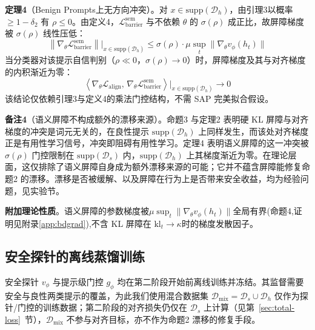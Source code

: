 \documentclass[lettersize,journal]{IEEEtran}
\begin{document}
\textbf{定理4}（Benign Prompts上无方向冲突）。对 $x \in \mathrm{supp}(\mathcal{D}_h)$，由引理3以概率 $\geq 1-\delta_2$ 有 $\rho \leq 0$。由定义4，$\mathcal{L}^{\text{sem}}_{\text{barrier}}$ 与不依赖 $\theta$ 的 $\sigma(\rho)$ 成正比，故屏障梯度被 $\sigma(\rho)$ 线性压低：
\begin{equation}
\left\|\nabla_\theta \mathcal{L}^{\text{sem}}_{\text{barrier}}\right\|\bigg|_{x \in \mathrm{supp}(\mathcal{D}_h)} \leq \sigma(\rho)\cdot \mu\sup_t\|\nabla_\theta v_\phi(h_t)\|
\end{equation}
当分类器对该提示自信判别（$\rho \ll 0$，$\sigma(\rho) \to 0$）时，屏障梯度及其与对齐梯度的内积渐近为零：
\begin{equation}\label{eq:no-conflict-benign}
\left\langle \nabla_\theta \mathcal{L}_{\text{align}},\, \nabla_\theta \mathcal{L}^{\text{sem}}_{\text{barrier}} \right\rangle\bigg|_{x \in \mathrm{supp}(\mathcal{D}_h)} \to 0
\end{equation}
该结论仅依赖引理3与定义4的乘法门控结构，不需 SAP 完美拟合假设。

\textbf{备注4}（语义屏障不构成额外的漂移来源）。命题3 与定理2 表明硬 KL 屏障与对齐梯度的冲突是词元无关的，在良性提示 $\mathrm{supp}(\mathcal{D}_h)$ 上同样发生，而该处对齐梯度正是有用性学习信号，冲突即阻碍有用性学习。定理4 表明语义屏障的这一冲突被 $\sigma(\rho)$ 门控限制在 $\mathrm{supp}(\mathcal{D}_s)$ 内，$\mathrm{supp}(\mathcal{D}_h)$ 上其梯度渐近为零。在理论层面，这仅排除了语义屏障自身成为额外漂移来源的可能；它并不蕴含屏障能修复命题2 的漂移。漂移是否被缓解、以及屏障在行为上是否带来安全收益，均为经验问题，见实验节。

\textbf{附加理论性质}。语义屏障的参数梯度被$\mu\sup_t\|\nabla_\theta v_\phi(h_t)\|$全局有界(命题4,证明见附录\ref{app:bdgrad}),不含 KL 屏障在 $\mathrm{kl}_t \to \kappa$时的梯度发散因子。

\subsection{安全探针的离线蒸馏训练}\label{Dmix SAP}
安全探针 $v_\phi$ 与提示级门控 $g_\phi$ 均在第二阶段开始前离线训练并冻结。其监督需要安全与良性两类提示的覆盖，为此我们使用混合数据集 $\mathcal{D}_{\text{mix}} = \mathcal{D}_s \cup \mathcal{D}_h$ 仅作为探针/门控的训练数据；第二阶段的对齐损失仍仅在 $\mathcal{D}_s$ 上计算（见第~\ref{sec:total-loss}~节），$\mathcal{D}_{\text{mix}}$ 不参与对齐目标，亦不作为命题2 漂移的修复手段。
\end{document}

